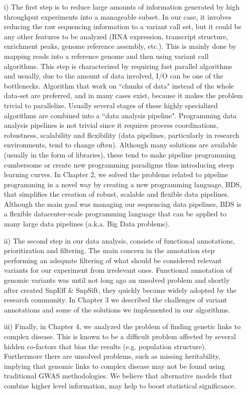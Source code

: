 \begin{itemize}
\item[i)] The first step is to reduce large amounts of information generated by high throughput experiments into a manageable subset. In our case, it involves reducing the raw sequencing information to a variant call set, but it could be any other features to be analyzed (RNA expression, transcript structure, enrichment peaks, genome reference assembly, etc.). This is mainly done by mapping reads into a reference genome and then using variant call algorithms. This step is characterized by requiring fast parallel algorithms and usually, due to the amount of data involved, I/O can be one of the bottlenecks. Algorithm that work on ``chunks of data" instead of the whole data-set are preferred, and in many cases exist, because it makes the problem trivial to parallelize. Usually several stages of these highly specialized algorithms are combined into a ``data analysis pipeline". Programming data analysis pipelines is not trivial since it requires process coordinations, robustness, scalability and flexibility (data pipelines, particularly in research environments, tend to change often). Although many solutions are available (usually in the form of libraries), these tend to make pipeline programming cumbersome or create new programming paradigms thus introducing steep learning curves. In Chapter 2, we solved the problems related to pipeline programming in a novel way by creating a new programming language, BDS, that simplifies the creation of robust, scalable and flexible data pipelines. Although the main goal was managing our sequencing data pipelines, BDS is a flexible datacenter-scale programming language that can be applied to many large data pipelines (a.k.a. Big Data problems).

\item[ii)] The second step in our data analysis, consists of functional annotations, prioritization and filtering. The main concern in the annotation step performing an adequate filtering of what should be considered relevant variants for our experiment from irrelevant ones. Functional annotation of genomic variants was until not long ago an unsolved problem and shortly after created SnpEff \& SnpSift, they quickly became widely adopted by the research community. In Chapter 3 we described the challenges of variant annotations and some of the solutions we implemented in our algorithms.

\item[iii)] Finally, in Chapter 4, we analyzed the problem of  finding genetic links to complex disease. This is known to be a difficult problem affected by several hidden co-factors that bias the results (e.g. population structure). Furthermore there are unsolved problems, such as missing heritability, implying that genomic links to complex disease may not be found using traditional GWAS methodologies. We believe that alternative models that combine higher level information, may help to boost statistical significance. 


\end{itemize}

